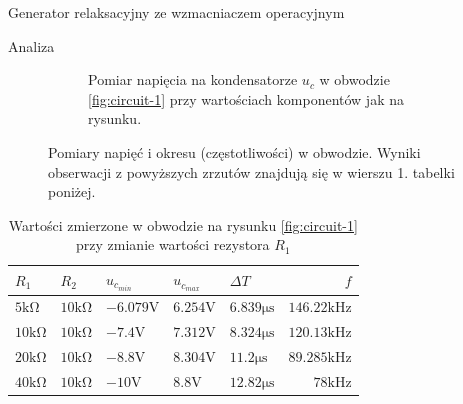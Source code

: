 \documentclass[a4paper]{scrartcl}
\begin{document}
\begin{section}{Generator relaksacyjny ze wzmacniaczem operacyjnym}
\begin{subsection}{Analiza}
\begin{figure}[!ht]
\begin{center}
\begin{subfigure}{.45\textwidth}
\begin{center}
						\caption{Pomiar napięcia na kondensatorze $u_{c} $ w obwodzie \ref{fig:circuit-1} przy wartościach komponentów jak na rysunku.}
						\label{fig:exercise-2-punkt-pracy}
						\end{center}
					\end{subfigure}
				\end{center}
				\caption{Pomiary napięć i okresu (częstotliwości) w obwodzie. Wyniki obserwacji z powyższych zrzutów znajdują się w wierszu 1. tabelki poniżej.}
				\end{figure}

				\begin{table}[!ht]
					\begin{center}
					\caption{Wartości zmierzone w obwodzie na rysunku \ref{fig:circuit-1} przy zmianie wartości rezystora $ R_{1} $}
					\begin{tabular}{| l | l | l | l | l | r |}
						\hline
						$ R_{1} $ & $ R_{2} $ & $ u_{c_{min}} $ & $ u_{c_{max}} $ & $ \Delta T $ & $ f $ \\ \hline
						$ 5\mathrm{k\Omega} $ & $ 10\mathrm{k\Omega} $ & $ -6.079\mathrm{V} $ & $ 6.254\mathrm{V} $ & $ 6.839 \mathrm{\mu s} $ & $ 146.22 \mathrm{kHz} $ \\ \hline
						$ 10\mathrm{k\Omega} $ & $ 10\mathrm{k\Omega} $ & $ -7.4\mathrm{V} $ & $ 7.312\mathrm{V} $ & $ 8.324 \mathrm{\mu s} $ & $ 120.13 \mathrm{kHz} $ \\ \hline
						$ 20\mathrm{k\Omega} $ & $ 10\mathrm{k\Omega} $ & $ -8.8\mathrm{V} $ & $ 8.304\mathrm{V} $ & $ 11.2 \mathrm{\mu s} $ & $ 89.285 \mathrm{kHz} $ \\ \hline
						$ 40\mathrm{k\Omega} $ & $ 10\mathrm{k\Omega} $ & $ -10\mathrm{V} $ & $ 8.8\mathrm{V} $ & $ 12.82 \mathrm{\mu s} $ & $ 78\mathrm{kHz} $ \\ \hline
					\end{tabular}
					\end{center}
				\end{table}
				

\end{subsection}
\end{section}
\end{document}
